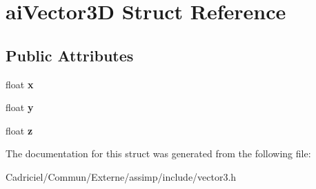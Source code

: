 \hypertarget{structai_vector3_d}{}\section{ai\+Vector3D Struct Reference}
\label{structai_vector3_d}
\subsection*{Public Attributes}
\begin{DoxyCompactItemize}
\item 
float {\bfseries x}\hypertarget{structai_vector3_d_a3762d39eeb99def9ebd413b2bb8dd470}{}\label{structai_vector3_d_a3762d39eeb99def9ebd413b2bb8dd470}

\item 
float {\bfseries y}\hypertarget{structai_vector3_d_ac7b5fcc03324f8c3bc8429c95882dfb8}{}\label{structai_vector3_d_ac7b5fcc03324f8c3bc8429c95882dfb8}

\item 
float {\bfseries z}\hypertarget{structai_vector3_d_a2b93b892064995e8d24f4e3352175aae}{}\label{structai_vector3_d_a2b93b892064995e8d24f4e3352175aae}

\end{DoxyCompactItemize}


The documentation for this struct was generated from the following file\+:\begin{DoxyCompactItemize}
\item 
Cadriciel/\+Commun/\+Externe/assimp/include/vector3.\+h\end{DoxyCompactItemize}
